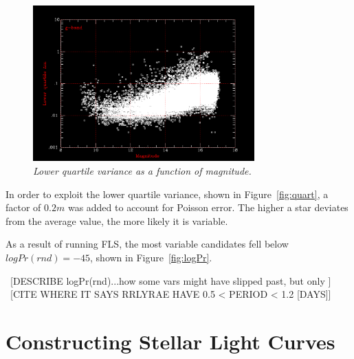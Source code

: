 \documentclass[aps,prb,twocolumn,superscriptaddress]{revtex4-1}
\begin{document}
\begin{figure}[H]
 \centering
 	\includegraphics[width=3.35in]{figures/NEW/scatter_gfilt_57452_57455.png}
 \caption{\it \small{Lower quartile variance as a function of magnitude.}}
 \label{fig:probrrHPS}
\end{figure}
  In order to exploit the lower quartile variance, shown in Figure~\ref{fig:quart}, a factor of $0.2m$ was added to account for Poisson error.  
The higher a star deviates from the average value, the more likely it is variable.  


As a result of running FLS, the most variable candidates fell below $logPr(rnd)= -45$, shown in Figure~\ref{fig:logPr}.  



~[DESCRIBE logPr(rnd)...how some vars might have slipped past, but only ]\\
~[CITE WHERE IT SAYS RRLYRAE HAVE 0.5 < PERIOD < 1.2 [DAYS]]\\

\section{Constructing Stellar Light Curves}

\end{document}
